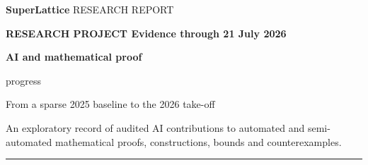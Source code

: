 \documentclass[11pt,a4paper]{article}
\begin{document}
\begin{titlepage}
\thispagestyle{empty}

\noindent\colorbox{Ink}{\parbox[c][24mm][c]{\paperwidth}{%
  \hspace*{19mm}%
  {\fontsize{17}{20}\selectfont\bfseries\color{white}SuperLattice}%
  \hfill
  {\fontsize{9.5}{12}\selectfont\color{white!72}RESEARCH REPORT}%
  \hspace*{19mm}}}

\vspace{18mm}
\begin{minipage}{\paperwidth}
\hspace*{22mm}\begin{minipage}{167mm}
  {\fontsize{9.5}{12}\selectfont\bfseries\color{Blue}\MakeUppercase{Research project}\hspace{2mm}%
   \color{Muted}\textnormal{Evidence through 21 July 2026}}\par
  \vspace{6mm}

  {\RaggedRight\fontsize{31}{34}\selectfont\bfseries\color{Ink}%
   AI and mathematical proof\par progress}\par
  \vspace{5mm}

  {\RaggedRight\fontsize{17}{21}\selectfont\color{Slate}%
   From a sparse 2025 baseline to the 2026 take-off}\par
  \vspace{5mm}

  {\RaggedRight\fontsize{11}{16}\selectfont\color{Muted}%
   An exploratory record of audited AI contributions to automated and semi-automated mathematical proofs, constructions, bounds and counterexamples.}\par

  \vspace{10mm}
  {\color{Rule}\rule{\linewidth}{0.6pt}}\par
  \vspace{7mm}


\end{minipage}
\end{minipage}
\end{titlepage}
\end{document}
